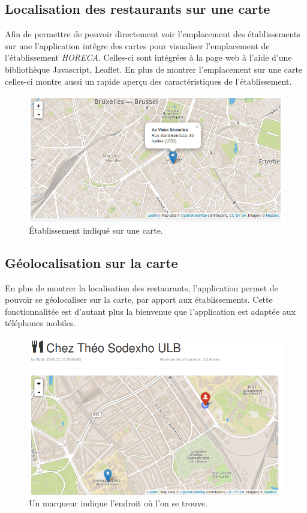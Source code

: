 \documentclass[a4paper,10pt]{article}
\begin{document}
\subsection{Localisation des restaurants sur une carte}
    Afin de permettre de pouvoir directement voir l'emplacement des
    établissements sur une l'application intêgre des cartes pour visualiser
    l'emplacement de l'établissement \emph{HORECA}. Celles-ci sont intégrées à
    la page web à l'aide d'une bibliothèque Javascript, Leaflet.
    En plus de montrer l'emplacement sur une carte celles-ci montre aussi un
    rapide aperçu des caractéristiques de l'établissement.

    \begin{figure}[h]
        \centering
        \includegraphics[scale=0.4]{./images/card.png}
        \caption{Établissement indiqué sur une carte.}
    \end{figure}

\subsection{Géolocalisation sur la carte}
    En plus de montrer la localisation des restaurants, l'application permet
    de pouvoir se géolocaliser sur la carte, par apport aux établissements.
    \newline
    Cette fonctionnalitée est d'autant plus la bienvenue que l'application est
    adaptée aux téléphones mobiles.

    \begin{figure}[h]
        \centering
        \includegraphics[scale=0.4]{./images/geolocalisation.png}
        \caption{Un marqueur indique l'endroit où l'on se trouve.}
    \end{figure}
\end{document}
